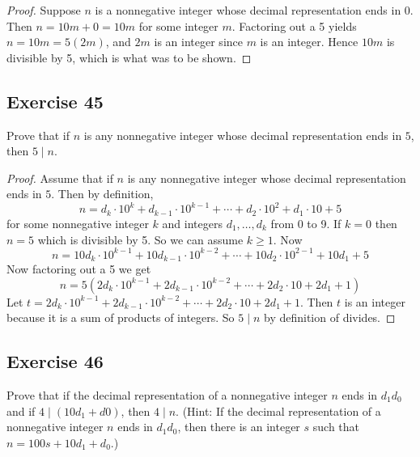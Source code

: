 \documentclass[14pt]{extarticle}
\begin{document}
\begin{proof}
    Suppose $n$ is a nonnegative integer whose decimal representation ends in 0. Then $n = 10m + 0 = 10m$ for
    some integer $m$. Factoring out a 5 yields $n = 10m = 5(2m)$, and $2m$ is an integer since $m$ is an integer. Hence $10m$ is divisible by 5, which is what was to be shown.
\end{proof}

\subsection{Exercise 45}
Prove that if $n$ is any nonnegative integer whose decimal representation ends in $5$, then $5\mid n$.

\begin{proof}
    Assume that if $n$ is any nonnegative integer whose decimal representation ends in $5$. Then by definition,
    \[
        n = d_k \cdot 10^k + d_{k-1} \cdot 10^{k-1} + \cdots + d_2 \cdot 10^2 + d_1 \cdot 10 + 5
    \]
    for some nonnegative integer $k$ and integers $d_1, \ldots, d_k$ from 0 to 9. If $k = 0$ then $n = 5$ which is divisible by 5. So we can assume $k \geq 1$. Now
    \[
        n = 10d_k \cdot 10^{k-1} + 10d_{k-1} \cdot 10^{k-2} + \cdots + 10d_2 \cdot 10^{2-1} + 10 d_1 + 5
    \]
    Now factoring out a 5 we get
    \[
        n = 5(2d_k \cdot 10^{k-1} + 2d_{k-1} \cdot 10^{k-2} + \cdots + 2d_2 \cdot 10 + 2 d_1 + 1)
    \]
    Let $t = 2d_k \cdot 10^{k-1} + 2d_{k-1} \cdot 10^{k-2} + \cdots + 2d_2 \cdot 10 + 2 d_1 + 1$. Then $t$ is an integer because it is a sum of products of integers. So $5 \mid n$ by definition of divides.
\end{proof}

\subsection{Exercise 46}
Prove that if the decimal representation of a nonnegative integer $n$ ends in $d_1d_0$ and if $4 \mid (10d_1 + d0)$, then $4\mid n$. (Hint: If the decimal representation of a nonnegative integer $n$ ends in $d_1d_0$, then there is an integer $s$ such that $n = 100s + 10d_1 + d_0$.)
\end{document}
